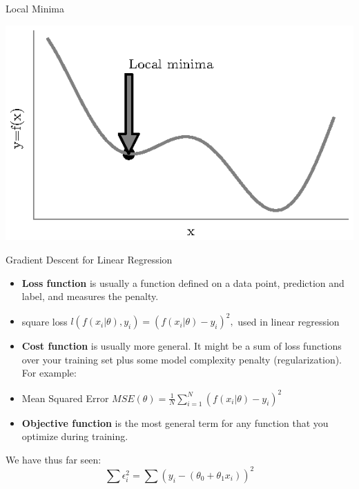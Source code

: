 \documentclass{beamer}
\begin{document}
	\begin{frame}{Local Minima}
\begin{center}
	\includegraphics[totalheight=6cm]{gradient-descent/local-minima.eps}
\end{center}
\end{frame}


\begin{frame}{Gradient Descent for Linear Regression}

\begin{itemize}[<+->]
	\item \textbf{Loss function} is usually a function defined on a data point, prediction and label, and measures the penalty. 
	\item square loss \(l\left(f\left(x_{i} | \theta\right), y_{i}\right)=\left(f\left(x_{i} | \theta\right)-y_{i}\right)^{2},\) used in linear regression
	\item \textbf{Cost function} is usually more general. It might be a sum of loss functions over your training set plus some model complexity penalty (regularization). For example:
	\item Mean Squared Error \(M S E(\theta)=\frac{1}{N} \sum_{i=1}^{N}\left(f\left(x_{i} | \theta\right)-y_{i}\right)^{2}\)
	\item \textbf{Objective function} is the most general term for any function that you optimize during training.
\end{itemize}

\pause We have thus far seen:
\pause \begin{equation*}
\sum \epsilon_{i}^{2} = \sum (y_{i} - (\theta_{0} + \theta_{1}x_{i}))^{2}
\end{equation*}
\end{frame}
\end{document}

